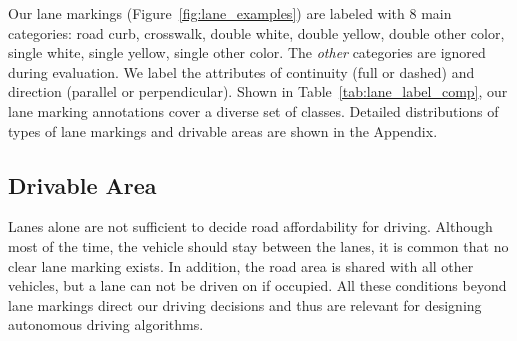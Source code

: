 Our lane markings (Figure~\ref{fig:lane_examples}) are labeled with 8 main categories: road curb,
crosswalk, double white, double yellow, double other color, single white, single yellow, single other color. The \textit{other} categories are ignored during evaluation.
We label the attributes of continuity (full or dashed) and direction (parallel or perpendicular). Shown
in Table~\ref{tab:lane_label_comp}, our lane marking annotations cover a diverse set of classes. Detailed
distributions of types of lane markings and drivable areas are shown in the Appendix.
\vspace{-2mm}
\begin{table}[htp]
    \centering
    \caption{\small Lane marking statistics. Our lane marking annotations are significantly richer and are more diverse.\vspace{-2mm}}
    \label{tab:lane_label_comp}
\end{table}

\subsection{Drivable Area}

Lanes alone are not sufficient to decide road affordability for driving. Although most of the time, the vehicle should stay between the lanes, it is common that no clear lane marking exists. In addition, the road area is shared with all other vehicles, but a lane can not be driven on if occupied. All these conditions beyond lane markings direct our driving decisions and thus are relevant for designing autonomous driving algorithms.

